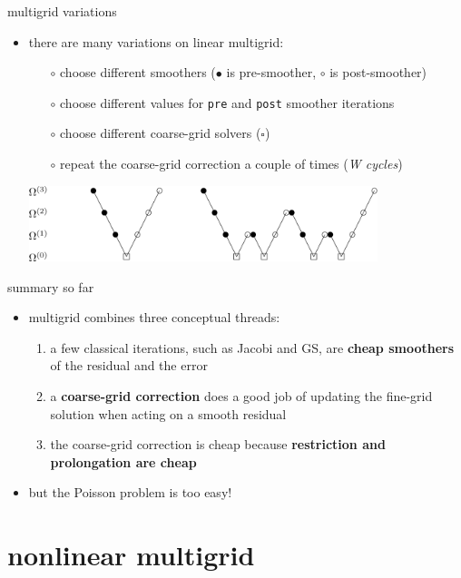 \documentclass[10pt,
               svgnames,
               hyperref={colorlinks,citecolor=DeepPink4,linkcolor=FireBrick,urlcolor=Maroon},
               usepdftitle=false]{beamer}
\begin{document}
\begin{frame}{multigrid variations}
\begin{itemize}
\item there are many variations on linear multigrid:
	\begin{itemize}
	\item[$\circ$] choose different smoothers ({\large $\bullet$} is pre-smoother, {\large $\circ$} is post-smoother)
	\item[$\circ$] choose different values for \texttt{pre} and \texttt{post} smoother iterations
	\item[$\circ$] choose different coarse-grid solvers ($\square$)
	\item[$\circ$] repeat the coarse-grid correction a couple of times (\emph{W cycles})
	\end{itemize}

\bigskip\bigskip
\hfill \includegraphics[width=0.8\textwidth]{images/multigrid-cycles.png}
\end{itemize}
\end{frame}


\begin{frame}{summary so far}
\begin{itemize}
\item multigrid combines three conceptual threads:
\begin{enumerate}
\item a few classical iterations, such as Jacobi and GS, are \textbf{cheap smoothers} of the residual and the error
\item a \textbf{coarse-grid correction} does a good job of updating the fine-grid solution when acting on a smooth residual
\item the coarse-grid correction is cheap because \textbf{restriction and prolongation are cheap}
\end{enumerate}

\bigskip
\item but the Poisson problem is too easy!
\end{itemize}
\end{frame}


\section{nonlinear multigrid}
\end{document}

